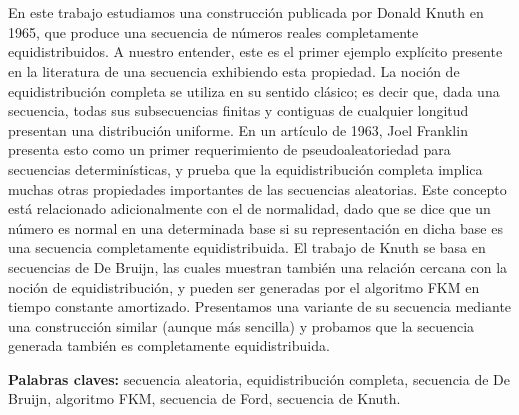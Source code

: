 \chapter*{\runtitulo}

\noindent En este trabajo estudiamos una construcción publicada por Donald Knuth en 1965, que produce una secuencia de números reales completamente equidistribuidos. A nuestro entender, este es el primer ejemplo explícito presente en la literatura de una secuencia exhibiendo esta propiedad. La noción de equidistribución completa se utiliza en su sentido clásico; es decir que, dada una secuencia, todas sus subsecuencias finitas y contiguas de cualquier longitud presentan una distribución uniforme. En un artículo de 1963, Joel Franklin presenta esto como un primer requerimiento de pseudoaleatoriedad para secuencias determinísticas, y prueba que la equidistribución completa implica muchas otras propiedades importantes de las secuencias aleatorias. Este concepto está relacionado adicionalmente con el de normalidad, dado que se dice que un número es normal en una determinada base si su representación en dicha base es una secuencia completamente equidistribuida. El trabajo de Knuth se basa en secuencias de De Bruijn, las cuales muestran también una relación cercana con la noción de equidistribución, y pueden ser generadas por el algoritmo FKM en tiempo constante amortizado. Presentamos una variante de su secuencia mediante una construcción similar (aunque más sencilla) y probamos que la secuencia generada también es completamente equidistribuida.

\bigskip

\noindent\textbf{Palabras claves:} secuencia aleatoria, equidistribución completa, secuencia de De Bruijn, algoritmo FKM, secuencia de Ford, secuencia de Knuth.